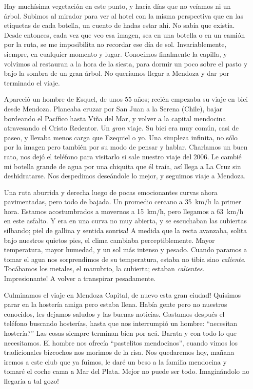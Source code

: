 Hay much\'isima vegetaci\'on en este punto, y hac\'ia d\'ias que no ve\'iamos ni
un \'arbol. Subimos al mirador para ver al hotel con la misma perspectiva que en
las etiquetas de cada botella, un cuento de hadas estar ah\'i. No sab\'ia que
exist\'ia. Desde entonces, cada vez que veo esa imagen, sea en una botella o en
un cami\'on por la ruta, se me imposibilita no recordar ese d\'ia de sol.
Invariablemente, siempre, en cualquier momento y lugar. Conocimos finalmente la
capilla, y volvimos al restauran a la hora de la siesta, para dormir un poco
sobre el pasto y bajo la sombra de un gran \'arbol. No quer\'iamos llegar a
Mendoza y dar por terminado el viaje.

Apareci\'o un hombre de Esquel, de unos 55 a\~nos; reci\'en empezaba su viaje en
bici desde Mendoza. Planeaba cruzar por San Juan a la Serena (Chile), bajar
bordeando el Pac\'ifico hasta Vi\~na del Mar, y volver a la capital mendocina
atravesando el Cristo Redentor. Un \emph{gran} viaje. Su bici era muy com\'un,
casi de paseo, y llevaba menos carga que Ezequiel o yo. Una simpleza infinita,
no s\'olo por la imagen pero tambi\'en por su modo de pensar y hablar. Charlamos
un buen rato, nos dej\'o el tel\'efono para visitarlo si sale nuestro viaje del
2006. Le cambi\'e mi botella grande de agua por una chiquita que \'el tra\'ia,
as\'i llega a La Cruz sin deshidratarse. Nos despedimos dese\'andole lo mejor, y
seguimos viaje a Mendoza.

Una ruta aburrida y derecha luego de pocas emocionantes curvas ahora
pavimentadas, pero todo de bajada. Un promedio cercano a 35~km/h la primer hora.
Estamos acostumbrados a movernos a 15~km/h, pero llegamos a 63~km/h en este
asfalto. Y era en una curva no muy abierta, y se escuchaban las cubiertas
silbando; \textexclamdown piel de gallina y sentida sonrisa! A medida que la
recta avanzaba, solita bajo nuestros quietos pies, el clima cambiaba
perceptiblemente. Mayor temperatura, mayor humedad, y un sol m\'as intenso y
pesado. Cuando paramos a tomar el agua nos sorprendimos de su temperatura,
estaba no tibia sino \emph{caliente}. Toc\'abamos los metales, el manubrio, la
cubierta; estaban \emph{calientes}. \textexclamdown Impresionante! A volver a
transpirar pesadamente.

Culminamos el viaje en Mendoza Capital, \textexclamdown de nuevo
esta gran ciudad! Quisimos parar en la hoster\'ia amiga pero estaba llena.
Hab\'ia gente pero no nuestros conocidos, les dejamos saludos y las buenas
noticias. Gastamos despu\'es el tel\'efono buscando hoster\'ias, hasta que nos
interrumpi\'o un hombre: ``\textquestiondown necesitan hoster\'ia?'' Las cosas
siempre terminan bien por ac\'a. Barata y con todo lo que necesitamos. El hombre
nos ofrec\'ia ``pastelitos mendocinos'', cuando vimos los tradicionales
bizcochos nos morimos de la risa. Nos quedaremos hoy, ma\~nana iremos a este
club que ya fuimos, le dar\'e un beso a la familia mendocina y tomar\'e el coche
cama a Mar del Plata. Mejor no puede ser todo. \textexclamdown Imagin\'andolo no
llegar\'ia a tal gozo!

